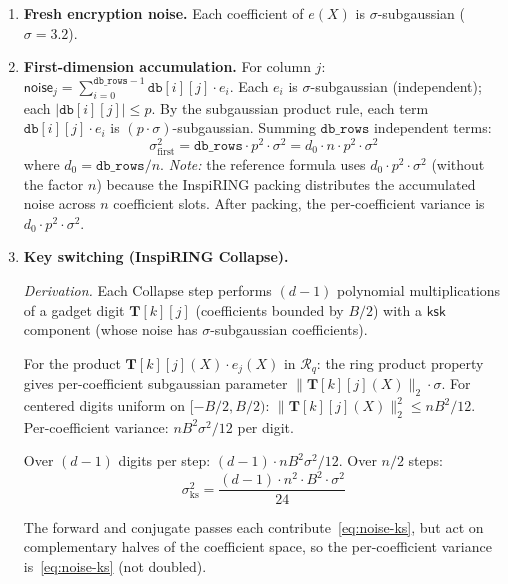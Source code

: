 \documentclass[11pt,a4paper]{article}
\newcommand{\R}{\mathcal{R}}
\newcommand{\Rq}{\R_{q}}
\begin{document}
\begin{enumerate}[nosep]
    \item \textbf{Fresh encryption noise.} Each coefficient of $e(X)$ is $\sigma$-subgaussian ($\sigma = 3.2$).

    \item \textbf{First-dimension accumulation.}
    For column $j$: $\mathsf{noise}_j = \sum_{i=0}^{\texttt{db\_rows}-1} \texttt{db}[i][j] \cdot e_i$.
    Each $e_i$ is $\sigma$-subgaussian (independent); each $|\texttt{db}[i][j]| \le p$.
    By the subgaussian product rule, each term $\texttt{db}[i][j] \cdot e_i$ is $(p \cdot \sigma)$-subgaussian.
    Summing $\texttt{db\_rows}$ independent terms:
    \begin{equation}
        \sigma_{\mathrm{first}}^2 = \texttt{db\_rows} \cdot p^2 \cdot \sigma^2 = d_0 \cdot n \cdot p^2 \cdot \sigma^2
        \label{eq:noise-first}
    \end{equation}
    where $d_0 = \texttt{db\_rows}/n$.
    \emph{Note:} the reference formula uses $d_0 \cdot p^2 \cdot \sigma^2$ (without the factor $n$) because the InspiRING packing distributes the accumulated noise across $n$ coefficient slots.
    After packing, the per-coefficient variance is $d_0 \cdot p^2 \cdot \sigma^2$.

    \item \textbf{Key switching (InspiRING Collapse).}

    \emph{Derivation.}
    Each Collapse step performs $(d\!-\!1)$ polynomial multiplications of a gadget digit $\mathbf{T}[k][j]$ (coefficients bounded by $B/2$) with a $\mathsf{ksk}$ component (whose noise has $\sigma$-subgaussian coefficients).

    For the product $\mathbf{T}[k][j](X) \cdot e_j(X)$ in $\Rq$: the ring product property gives per-coefficient subgaussian parameter $\|\mathbf{T}[k][j](X)\|_2 \cdot \sigma$.
    For centered digits uniform on $[-B/2, B/2)$: $\|\mathbf{T}[k][j](X)\|_2^2 \le n B^2/12$.
    Per-coefficient variance: $n B^2 \sigma^2 / 12$ per digit.

    Over $(d\!-\!1)$ digits per step: $(d\!-\!1) \cdot n B^2 \sigma^2 / 12$.
    Over $n/2$ steps:
    \begin{equation}
        \sigma_{\mathrm{ks}}^2 = \frac{(d\!-\!1) \cdot n^2 \cdot B^2 \cdot \sigma^2}{24}
        \label{eq:noise-ks}
    \end{equation}

    The forward and conjugate passes each contribute~\eqref{eq:noise-ks}, but act on complementary halves of the coefficient space, so the per-coefficient variance is~\eqref{eq:noise-ks} (not doubled).


\end{enumerate}
\end{document}
